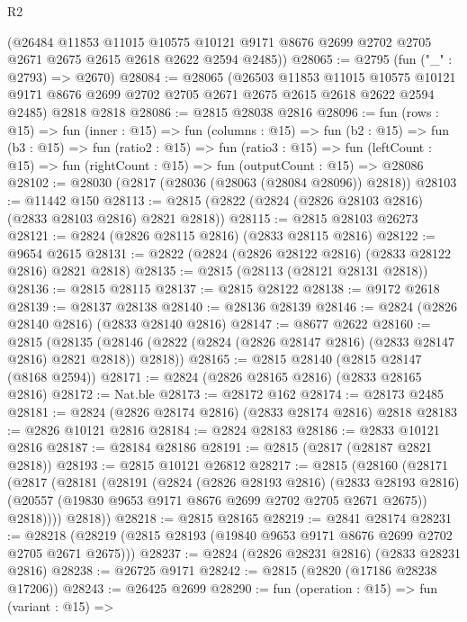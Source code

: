 \begin{lexlean}{R2}
\begin{coremodule}
      (@26484
        @11853
        @11015
        @10575
        @10121
        @9171
        @8676
        @2699
        @2702
        @2705
        @2671
        @2675
        @2615
        @2618
        @2622
        @2594
        @2485))
@28065 := @2795 (fun ("_" : @2793) => @2670)
@28084 := @28065
    (@26503
      @11853
      @11015
      @10575
      @10121
      @9171
      @8676
      @2699
      @2702
      @2705
      @2671
      @2675
      @2615
      @2618
      @2622
      @2594
      @2485)
    @2818
    @2818
@28086 := @2815 @28038 @2816
@28096 := fun (rows : @15) =>
  fun (inner : @15) =>
  fun (columns : @15) =>
  fun (b2 : @15) =>
  fun (b3 : @15) =>
  fun (ratio2 : @15) =>
  fun (ratio3 : @15) =>
  fun (leftCount : @15) => fun (rightCount : @15) => fun (outputCount : @15) => @28086
@28102 := @28030 (@2817 (@28036 (@28063 (@28084 @28096)) @2818))
@28103 := @11442 @150
@28113 := @2815 (@2822 (@2824 (@2826 @28103 @2816) (@2833 @28103 @2816) @2821 @2818))
@28115 := @2815 @28103 @26273
@28121 := @2824 (@2826 @28115 @2816) (@2833 @28115 @2816)
@28122 := @9654 @2615
@28131 := @2822 (@2824 (@2826 @28122 @2816) (@2833 @28122 @2816) @2821 @2818)
@28135 := @2815 (@28113 (@28121 @28131 @2818))
@28136 := @2815 @28115
@28137 := @2815 @28122
@28138 := @9172 @2618
@28139 := @28137 @28138
@28140 := @28136 @28139
@28146 := @2824 (@2826 @28140 @2816) (@2833 @28140 @2816)
@28147 := @8677 @2622
@28160 := @2815
    (@28135 (@28146 (@2822 (@2824 (@2826 @28147 @2816) (@2833 @28147 @2816) @2821 @2818)) @2818))
@28165 := @2815 @28140 (@2815 @28147 (@8168 @2594))
@28171 := @2824 (@2826 @28165 @2816) (@2833 @28165 @2816)
@28172 := Nat.ble
@28173 := @28172 @162
@28174 := @28173 @2485
@28181 := @2824 (@2826 @28174 @2816) (@2833 @28174 @2816) @2818
@28183 := @2826 @10121 @2816
@28184 := @2824 @28183
@28186 := @2833 @10121 @2816
@28187 := @28184 @28186
@28191 := @2815 (@2817 (@28187 @2821 @2818))
@28193 := @2815 @10121 @26812
@28217 := @2815
    (@28160
      (@28171
        (@2817
          (@28181
            (@28191
              (@2824
                (@2826 @28193 @2816)
                (@2833 @28193 @2816)
                (@20557 (@19830 @9653 @9171 @8676 @2699 @2702 @2705 @2671 @2675))
                @2818))))
        @2818))
@28218 := @2815 @28165
@28219 := @2841 @28174
@28231 := @28218 (@28219 (@2815 @28193 (@19840 @9653 @9171 @8676 @2699 @2702 @2705 @2671 @2675)))
@28237 := @2824 (@2826 @28231 @2816) (@2833 @28231 @2816)
@28238 := @26725 @9171
@28242 := @2815 (@2820 (@17186 @28238 @17206))
@28243 := @26425 @2699
@28290 := fun (operation : @15) =>
  fun (variant : @15) =>

\end{coremodule}
\end{lexlean}
